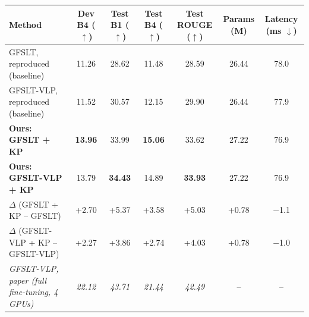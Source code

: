 \documentclass[8pt,a4paper]{article}
\begin{document}
\begin{center}


\label{tab:results}

\small

\begin{tabularx}{\linewidth}{
    @{}X c c c c c c@{}
}

\toprule

\textbf{Method}
&
\makecell{\textbf{Dev B4}\\($\uparrow$)}
&
\makecell{\textbf{Test B1}\\($\uparrow$)}
&
\makecell{\textbf{Test B4}\\($\uparrow$)}
&
\makecell{\textbf{Test ROUGE}\\($\uparrow$)}
&
\makecell{\textbf{Params}\\(M)}
&
\makecell{\textbf{Latency}\\(ms $\downarrow$)}
\\

\midrule

GFSLT, reproduced (baseline)
& 11.26 & 28.62 & 11.48 & 28.59 & 26.44 & 78.0 \\

GFSLT-VLP, reproduced (baseline)
& 11.52 & 30.57 & 12.15 & 29.90 & 26.44 & 77.9 \\

\textbf{Ours: GFSLT + KP}
& \textbf{13.96} & 33.99 & \textbf{15.06} & 33.62 & 27.22 & 76.9 \\

\textbf{Ours: GFSLT-VLP + KP}
& 13.79 & \textbf{34.43} & 14.89 & \textbf{33.93} & 27.22 & 76.9 \\

\midrule

$\Delta$ (GFSLT + KP -- GFSLT)
& +2.70 & +5.37 & +3.58 & +5.03 & +0.78 & $-$1.1 \\

$\Delta$ (GFSLT-VLP + KP -- GFSLT-VLP)
& +2.27 & +3.86 & +2.74 & +4.03 & +0.78 & $-$1.0 \\

\midrule

\textit{GFSLT-VLP, paper (full fine-tuning, 4 GPUs)}
& \textit{22.12} & \textit{43.71} & \textit{21.44} & \textit{42.49} & -- & -- \\

\bottomrule

\end{tabularx}

\end{center}
\end{document}
